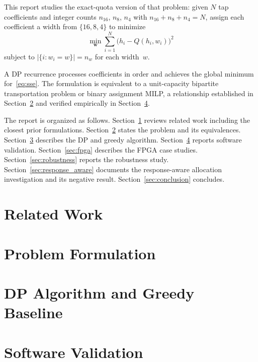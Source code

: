 \documentclass[journal]{IEEEtran}
\begin{document}
This report studies the exact-quota version of that problem: given
$N$ tap coefficients and integer counts $n_{16}$, $n_8$, $n_4$ with
$n_{16}+n_8+n_4=N$, assign each coefficient a width from
$\{16,8,4\}$ to minimize
\begin{equation}
\min_{\mathbf{w}} \sum_{i=1}^{N} \bigl(h_i - Q(h_i,w_i)\bigr)^2
\label{eq:sse}
\end{equation}
subject to $|\{i: w_i=w\}|=n_w$ for each width~$w$.

A DP recurrence processes coefficients in order and achieves the global
minimum for~\eqref{eq:sse}. The formulation is equivalent to a
unit-capacity bipartite transportation problem or binary assignment
MILP, a relationship established in Section~\ref{sec:formulation}
and verified empirically in Section~\ref{sec:validation}.

The report is organized as follows. Section~\ref{sec:related}
reviews related work including the closest prior formulations.
Section~\ref{sec:formulation} states the problem and its equivalences.
Section~\ref{sec:algorithm} describes the DP and greedy algorithm.
Section~\ref{sec:validation} reports software validation.
Section~\ref{sec:fpga} describes the FPGA case studies.
Section~\ref{sec:robustness} reports the robustness study.
Section~\ref{sec:response_aware} documents the response-aware
allocation investigation and its negative result.
Section~\ref{sec:conclusion} concludes.

\section{Related Work}
\label{sec:related}



\section{Problem Formulation}
\label{sec:formulation}



\section{DP Algorithm and Greedy Baseline}
\label{sec:algorithm}



\section{Software Validation}
\label{sec:validation}
\end{document}
